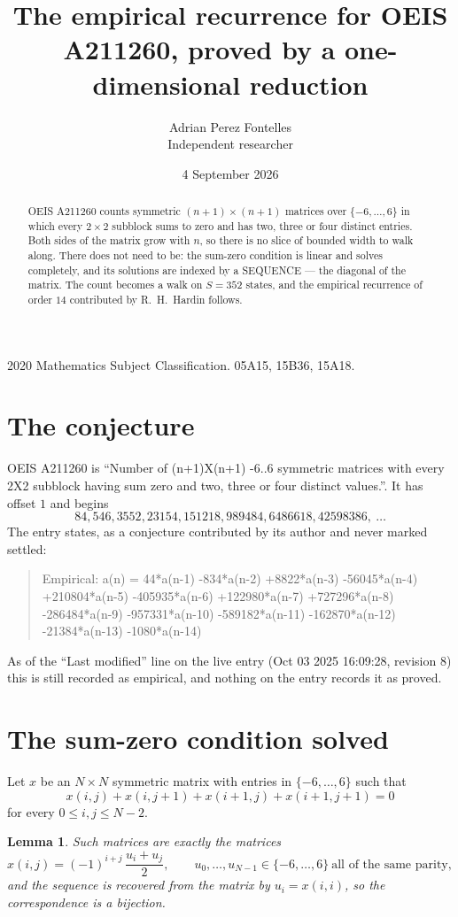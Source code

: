 \documentclass[11pt,a4paper]{article}
\title{The empirical recurrence for OEIS A211260, proved by a one-dimensional reduction}
\author{Adrian Perez Fontelles\\ \small Independent researcher}
\date{4 September 2026}
\theoremstyle{plain}
\newtheorem{lemma}[theorem]{Lemma}
\theoremstyle{definition}
\begin{document}
\maketitle

\begin{abstract}
OEIS A211260 counts symmetric $(n+1)\times(n+1)$ matrices over
$\{-6,\dots,6\}$ in which every $2\times2$ subblock sums to zero and has two, three or four distinct
entries. Both sides of the matrix grow with $n$, so there is no slice of bounded width to walk
along. There does not need to be: the sum-zero condition is linear and solves completely, and
its solutions are indexed by a SEQUENCE --- the diagonal of the matrix. The count becomes a walk
on $S=352$ states, and the empirical recurrence of order $14$ contributed by R.~H.~Hardin
follows.
\end{abstract}

\noindent\small 2020 Mathematics Subject Classification. 05A15, 15B36, 15A18.\normalsize

\section{The conjecture}

OEIS A211260 is ``Number of (n+1)X(n+1) -6..6 symmetric matrices with every 2X2 subblock having sum zero and two, three or four distinct values.''. It has offset $1$ and begins
\[
84, 546, 3552, 23154, 151218, 989484, 6486618, 42598386,\ \dots
\]
The entry states, as a conjecture contributed by its author and never marked settled:
\begin{quote}
Empirical: a(n) = 44*a(n-1) -834*a(n-2) +8822*a(n-3) -56045*a(n-4) +210804*a(n-5) -405935*a(n-6) +122980*a(n-7) +727296*a(n-8) -286484*a(n-9) -957331*a(n-10) -589182*a(n-11) -162870*a(n-12) -21384*a(n-13) -1080*a(n-14)
\end{quote}
As of the ``Last modified'' line on the live entry (Oct 03 2025 16:09:28, revision 8) this is still
recorded as empirical, and nothing on the entry records it as proved.

\section{The sum-zero condition solved}

Let $x$ be an $N\times N$ symmetric matrix with entries in $\{-6,\dots,6\}$ such that
\[
x(i,j)+x(i,j{+}1)+x(i{+}1,j)+x(i{+}1,j{+}1)=0
\]
for every $0\le i,j\le N-2$.

\begin{lemma}\label{lem:solve}
Such matrices are exactly the matrices
\[
x(i,j)=(-1)^{i+j}\,\frac{u_i+u_j}{2},
\qquad u_0,\dots,u_{N-1}\in\{-6,\dots,6\}\ \text{all of the same parity},
\]
and the sequence is recovered from the matrix by $u_i=x(i,i)$, so the correspondence is a
bijection.
\end{lemma}
\end{document}
